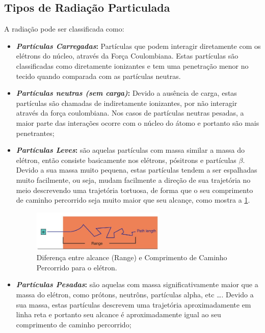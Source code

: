 \documentclass[11pt,a4paper]{article}
\begin{document}
\subsection*{Tipos de Radiação Particulada}

    A radiação pode ser classificada como:

    \begin{itemize}
		\item \textbf{\textit{\textcolor{CarnationPink}{Partículas Carregadas}}:} Partículas que podem interagir diretamente com os elétrons do núcleo, através da Força Coulombiana. Estas partículas são classificadas como diretamente ionizantes e tem uma penetração menor no tecido quando comparada com as partículas neutras.
		
		\item \textbf{\textit{\textcolor{CarnationPink}{Partículas neutras (sem carga)}}:}  Devido a ausência de carga, estas partículas são chamadas de indiretamente ionizantes, por não interagir através da força coulombiana. Nos casos de partículas neutras pesadas, a maior parte das interações ocorre com o núcleo do átomo e portanto são mais penetrantes; 
		
		\item \textbf{\textit{\textcolor{CarnationPink}{Partículas Leves}}:} são aquelas partículas com massa similar a massa do elétron, então consiste basicamente nos elétrons, pósitrons e partículas $\beta$. Devido a sua massa muito pequena, estas partículas tendem a ser espalhadas muito facilmente, ou seja, mudam facilmente a direção de sua trajetória no meio descrevendo uma trajetória tortuosa, de forma que o seu comprimento de caminho percorrido  seja muito maior que seu alcançe, como mostra a \ref{fig:alcanceECaminhoPercorrido}.

			\begin{figure}[h]
				\centering
				\includegraphics[width=0.6\textwidth]{Imagens/alcanceECaminhoPercorrido.JPG}
				\caption{Diferença entre alcance (Range) e Comprimento de Caminho Percorrido para o elétron.}
				\label{fig:alcanceECaminhoPercorrido}
			\end{figure}

		\item \textbf{\textit{\textcolor{CarnationPink}{Partículas Pesadas}}:} são aquelas com massa significativamente maior que a massa do elétron, como prótons, neutrôns, partículas alpha, etc \dots. Devido a sua massa, estas partículas descrevem uma trajetória aproximadamente em linha reta e portanto seu alcance é aproximadamente igual ao seu comprimento de caminho percorrido; 

	\end{itemize}
\end{document}
